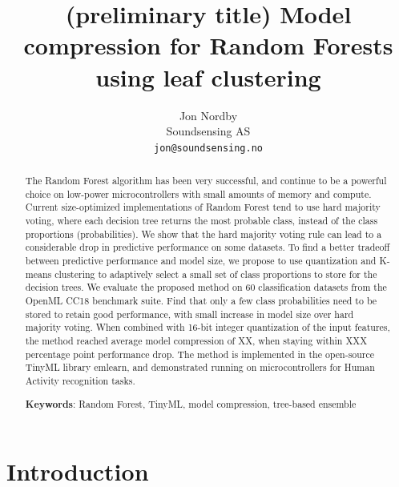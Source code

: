 \documentclass{article}
\begin{document}
\title{(preliminary title) Model compression for Random Forests using leaf clustering}

\author{
    Jon Nordby \\
	Soundsensing AS \\
	\texttt{jon@soundsensing.no} \\	
}

\date{}

\maketitle
\renewcommand{\abstractname}{\vspace{-\baselineskip}} %

\begin{abstract}	\noindent
The Random Forest algorithm has been very successful, and continue to be a powerful choice on low-power microcontrollers with small amounts of memory and compute.
Current size-optimized implementations of Random Forest tend to use hard majority voting, where each decision tree returns the most probable class, instead of the class proportions (probabilities).
We show that the hard majority voting rule can lead to a considerable drop in predictive performance on some datasets.
To find a better tradeoff between predictive performance and model size, we propose to use quantization and K-means clustering to adaptively select a small set of class proportions to store for the decision trees.
We evaluate the proposed method on 60 classification datasets from the OpenML CC18 benchmark suite.
Find that only a few class probabilities need to be stored to retain good performance,
with small increase in model size over hard majority voting.
When combined with 16-bit integer quantization of the input features, the method reached average model compression of XX, when staying within XXX percentage point performance drop.
The method is implemented in the open-source TinyML library emlearn, and demonstrated running on microcontrollers for Human Activity recognition tasks.

\noindent \textbf{Keywords}: Random Forest, TinyML, model compression, tree-based ensemble

\end{abstract}


\section{Introduction}
\end{document}
